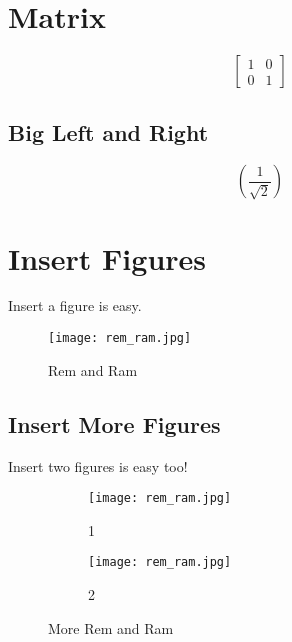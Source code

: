 \documentclass{article}
\begin{document}
\newpage

\section{Matrix}
\begin{equation}
    \left[
    \begin{matrix}
    1&0\\
    0&1
    \end{matrix}
    \right]
\end{equation}
\subsection{Big Left and Right}
\begin{equation}
    \left(
    \frac{1}{\sqrt{2}}
    \right)
\end{equation}

\section{Insert Figures}
Insert a figure is easy.
\begin{figure}[h!]
    \centering
    \texttt{[image: rem\_ram.jpg]}
    \caption{Rem and Ram}
    \label{fig:rem_ram}
\end{figure}

\subsection{Insert More Figures}
Insert two figures is easy too!
\begin{figure}[h!]
    \centering
    \begin{subfigure}[b]{0.2\linewidth}
        \texttt{[image: rem\_ram.jpg]}
        \caption{1}
    \end{subfigure}
    \begin{subfigure}[b]{0.2\linewidth}
        \texttt{[image: rem\_ram.jpg]}
        \caption{2}
    \end{subfigure}
    \caption{More Rem and Ram}
\end{figure}

\newpage
\end{document}
